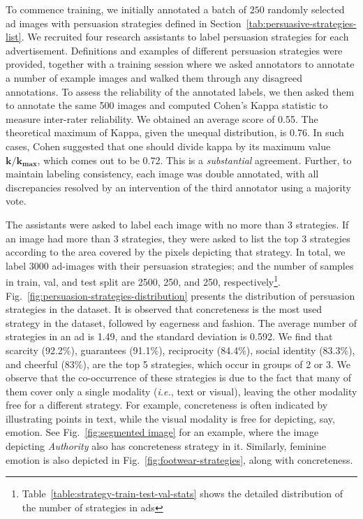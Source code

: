 \documentclass[hidelinks,11pt,a4paper]{report}
\renewcommand{\cite}[1]{\citep{#1}}
\begin{document}
To commence training, we initially annotated a batch of $250$ randomly selected ad images with persuasion strategies defined in Section~\ref{tab:persuasive-strategies-list}. We recruited four research assistants to label persuasion strategies for each advertisement. Definitions and examples of different persuasion strategies were provided, together with a training session where we asked annotators to annotate a number of example images and walked them through any disagreed annotations. To assess the reliability of the annotated labels, we then asked them to annotate the same 500 images and computed Cohen's Kappa statistic to measure inter-rater reliability. We obtained an average score of 0.55. The theoretical maximum of Kappa, given the unequal distribution, is 0.76. In such cases, Cohen \cite{cohen1960coefficient} suggested that one should divide kappa by its maximum value $\mathbf{k}/\mathbf{k_{max}}$, which comes out to be 0.72. This is a \textit{substantial} agreement. Further, to maintain labeling consistency, each image was double annotated, with all discrepancies resolved by an intervention of the third annotator using a majority vote. 


The assistants were asked to label each image with no more than 3 strategies. If an image had more than 3 strategies, they were asked to list the top 3 strategies according to the area covered by the pixels depicting that strategy. In total, we label 3000 ad-images with their persuasion strategies; and the number of samples in train, val, and test split are 2500, 250, and 250, respectively\footnote{Table~\ref{table:strategy-train-test-val-stats} shows the detailed distribution of the number of strategies in ads}. Fig.~\ref{fig:persuasion-strategies-distribution} presents the distribution of persuasion strategies in the dataset. It is observed that concreteness is the most used strategy in the dataset, followed by eagerness and fashion. The average number of strategies in an ad is 1.49, and the standard deviation is 0.592. We find that scarcity (92.2\%), guarantees (91.1\%), reciprocity (84.4\%), social identity (83.3\%), and cheerful (83\%), %
are the top 5 strategies, which occur in groups of 2 or 3. We observe that the co-occurrence of these strategies is due to the fact that many of them cover only a single modality (\textit{i.e.}, text or visual), leaving the other modality free for a different strategy. For example, concreteness is often indicated by illustrating points in text, while the visual modality is free for depicting, say, emotion. See Fig.~\ref{fig:segmented image} for an example, where the image depicting \textit{Authority} also has concreteness strategy in it. Similarly, feminine emotion is also depicted in Fig.~\ref{fig:footwear-strategies}, along with concreteness.
\end{document}

